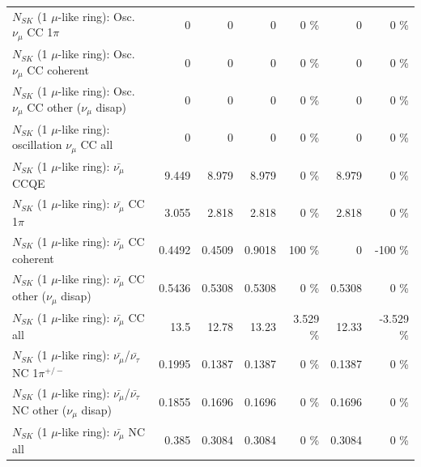\begin{table}
\begin{tabular}{| l | r | r | r  r | r  r |}
                          $N_{SK}$ (1 $\mu$-like ring): Osc. $\nu_\mu$ CC 1$\pi$ &               0 &               0 &               0 &        0 \%  &               0 &        0 \%  \\ 
                        $N_{SK}$ (1 $\mu$-like ring): Osc. $\nu_\mu$ CC coherent &               0 &               0 &               0 &        0 \%  &               0 &        0 \%  \\ 
         $N_{SK}$ (1 $\mu$-like ring): Osc. $\nu_\mu$ CC other ($\nu_\mu$ disap) &               0 &               0 &               0 &        0 \%  &               0 &        0 \%  \\ 
                      $N_{SK}$ (1 $\mu$-like ring): oscillation $\nu_\mu$ CC all &               0 &               0 &               0 &        0 \%  &               0 &        0 \%  \\ 
\hline
\hline
                              $N_{SK}$ (1 $\mu$-like ring): $\bar{\nu_\mu}$ CCQE &           9.449 &           8.979 &           8.979 &        0 \%  &           8.979 &        0 \%  \\ 
                         $N_{SK}$ (1 $\mu$-like ring): $\bar{\nu_\mu}$ CC 1$\pi$ &           3.055 &           2.818 &           2.818 &        0 \%  &           2.818 &        0 \%  \\ 
                       $N_{SK}$ (1 $\mu$-like ring): $\bar{\nu_\mu}$ CC coherent &          0.4492 &          0.4509 &          0.9018 &      100 \%  &               0 &     -100 \%  \\ 
        $N_{SK}$ (1 $\mu$-like ring): $\bar{\nu_\mu}$ CC other ($\nu_\mu$ disap) &          0.5436 &          0.5308 &          0.5308 &        0 \%  &          0.5308 &        0 \%  \\ 
                          $N_{SK}$ (1 $\mu$-like ring): $\bar{\nu_{\mu}}$ CC all &            13.5 &           12.78 &           13.23 &    3.529 \%  &           12.33 &   -3.529 \%  \\ 
\hline
  $N_{SK}$ (1 $\mu$-like ring): $\bar{\nu_\mu}$/$\bar{\nu_\tau}$ NC 1$\pi^{+/-}$ &          0.1995 &          0.1387 &          0.1387 &        0 \%  &          0.1387 &        0 \%  \\ 
$N_{SK}$ (1 $\mu$-like ring): $\bar{\nu_\mu}$/$\bar{\nu_\tau}$ NC other ($\nu_\mu$ disap) &          0.1855 &          0.1696 &          0.1696 &        0 \%  &          0.1696 &        0 \%  \\ 
                          $N_{SK}$ (1 $\mu$-like ring): $\bar{\nu_{\mu}}$ NC all &           0.385 &          0.3084 &          0.3084 &        0 \%  &          0.3084 &        0 \%  \\ 

\end{tabular}
\end{table}
